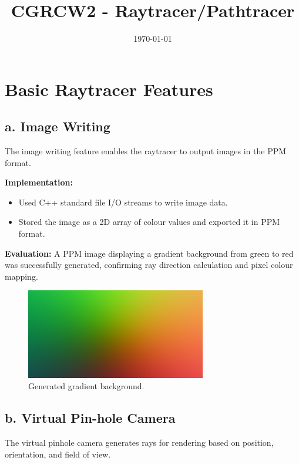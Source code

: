 \documentclass[11pt,a4paper]{article}
\title{CGRCW2 - Raytracer/Pathtracer}
\date{\today}
\begin{document}
\maketitle
\tableofcontents
\newpage


\section{Basic Raytracer Features}
\label{sec:basic-raytracer}

\subsection{a. Image Writing}
\label{sec:image-writing}

The image writing feature enables the raytracer to output images in the PPM format.

\noindent\textbf{Implementation:}
\begin{itemize} \item Used C++ standard file I/O streams to write image data.
\item Stored the image as a 2D array of colour values and exported it in PPM format.
\end{itemize}

\noindent\textbf{Evaluation:}
A PPM image displaying a gradient background from green to red was successfully generated, confirming ray direction calculation and pixel colour mapping.

\begin{figure}[H]
\centering
\includegraphics[width=0.7\textwidth]{image_writer.png}
\caption{Generated gradient background.}
\label{fig:output-gradient}
\end{figure}

\subsection{b. Virtual Pin-hole Camera}
\label{sec:virtual-camera}

The virtual pinhole camera generates rays for rendering based on position, orientation, and field of view.
\end{document}
